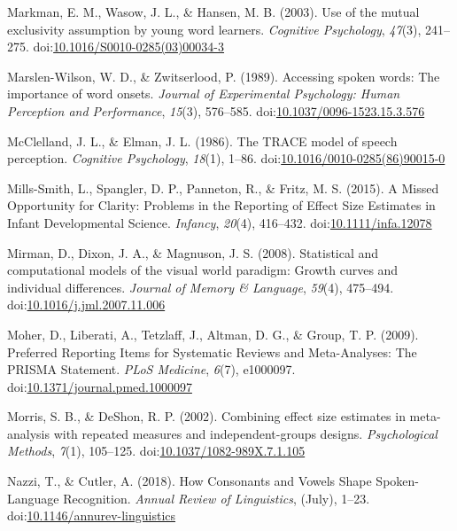 \documentclass[man]{apa6}
\begin{document}
\leavevmode\hypertarget{ref-Markman2003}{}%
Markman, E. M., Wasow, J. L., \& Hansen, M. B. (2003). Use of the mutual exclusivity assumption by young word learners. \emph{Cognitive Psychology}, \emph{47}(3), 241--275. doi:\href{https://doi.org/10.1016/S0010-0285(03)00034-3}{10.1016/S0010-0285(03)00034-3}

\leavevmode\hypertarget{ref-Marslen-Wilson1989}{}%
Marslen-Wilson, W. D., \& Zwitserlood, P. (1989). Accessing spoken words: The importance of word onsets. \emph{Journal of Experimental Psychology: Human Perception and Performance}, \emph{15}(3), 576--585. doi:\href{https://doi.org/10.1037/0096-1523.15.3.576}{10.1037/0096-1523.15.3.576}

\leavevmode\hypertarget{ref-McClelland1986}{}%
McClelland, J. L., \& Elman, J. L. (1986). The TRACE model of speech perception. \emph{Cognitive Psychology}, \emph{18}(1), 1--86. doi:\href{https://doi.org/10.1016/0010-0285(86)90015-0}{10.1016/0010-0285(86)90015-0}

\leavevmode\hypertarget{ref-Mills-Smith2015}{}%
Mills-Smith, L., Spangler, D. P., Panneton, R., \& Fritz, M. S. (2015). A Missed Opportunity for Clarity: Problems in the Reporting of Effect Size Estimates in Infant Developmental Science. \emph{Infancy}, \emph{20}(4), 416--432. doi:\href{https://doi.org/10.1111/infa.12078}{10.1111/infa.12078}

\leavevmode\hypertarget{ref-Mirman2008}{}%
Mirman, D., Dixon, J. A., \& Magnuson, J. S. (2008). Statistical and computational models of the visual world paradigm: Growth curves and individual differences. \emph{Journal of Memory \& Language}, \emph{59}(4), 475--494. doi:\href{https://doi.org/10.1016/j.jml.2007.11.006}{10.1016/j.jml.2007.11.006}

\leavevmode\hypertarget{ref-Moher2009}{}%
Moher, D., Liberati, A., Tetzlaff, J., Altman, D. G., \& Group, T. P. (2009). Preferred Reporting Items for Systematic Reviews and Meta-Analyses: The PRISMA Statement. \emph{PLoS Medicine}, \emph{6}(7), e1000097. doi:\href{https://doi.org/10.1371/journal.pmed.1000097}{10.1371/journal.pmed.1000097}

\leavevmode\hypertarget{ref-morris2002combining}{}%
Morris, S. B., \& DeShon, R. P. (2002). Combining effect size estimates in meta-analysis with repeated measures and independent-groups designs. \emph{Psychological Methods}, \emph{7}(1), 105--125. doi:\href{https://doi.org/10.1037/1082-989X.7.1.105}{10.1037/1082-989X.7.1.105}

\leavevmode\hypertarget{ref-Nazzi2018}{}%
Nazzi, T., \& Cutler, A. (2018). How Consonants and Vowels Shape Spoken-Language Recognition. \emph{Annual Review of Linguistics}, (July), 1--23. doi:\href{https://doi.org/10.1146/annurev-linguistics}{10.1146/annurev-linguistics}
\end{document}
